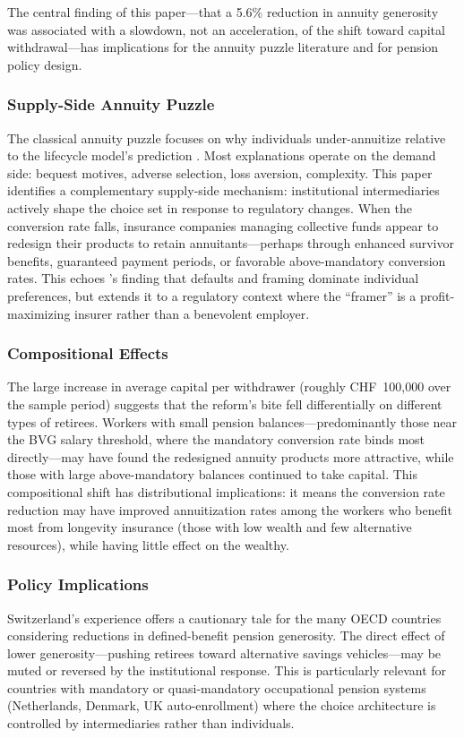 \documentclass[12pt]{article}
\begin{document}
The central finding of this paper---that a 5.6\% reduction in annuity generosity was associated with a slowdown, not an acceleration, of the shift toward capital withdrawal---has implications for the annuity puzzle literature and for pension policy design.

\subsubsection*{Supply-Side Annuity Puzzle} The classical annuity puzzle focuses on why individuals under-annuitize relative to the lifecycle model's prediction \citep{yaari1965uncertain}. Most explanations operate on the demand side: bequest motives, adverse selection, loss aversion, complexity. This paper identifies a complementary supply-side mechanism: institutional intermediaries actively shape the choice set in response to regulatory changes. When the conversion rate falls, insurance companies managing collective funds appear to redesign their products to retain annuitants---perhaps through enhanced survivor benefits, guaranteed payment periods, or favorable above-mandatory conversion rates. This echoes \citet{beshears2014annuitization}'s finding that defaults and framing dominate individual preferences, but extends it to a regulatory context where the ``framer'' is a profit-maximizing insurer rather than a benevolent employer.

\subsubsection*{Compositional Effects} The large increase in average capital per withdrawer (roughly CHF~100,000 over the sample period) suggests that the reform's bite fell differentially on different types of retirees. Workers with small pension balances---predominantly those near the BVG salary threshold, where the mandatory conversion rate binds most directly---may have found the redesigned annuity products more attractive, while those with large above-mandatory balances continued to take capital. This compositional shift has distributional implications: it means the conversion rate reduction may have improved annuitization rates among the workers who benefit most from longevity insurance (those with low wealth and few alternative resources), while having little effect on the wealthy.

\subsubsection*{Policy Implications} Switzerland's experience offers a cautionary tale for the many OECD countries considering reductions in defined-benefit pension generosity. The direct effect of lower generosity---pushing retirees toward alternative savings vehicles---may be muted or reversed by the institutional response. This is particularly relevant for countries with mandatory or quasi-mandatory occupational pension systems (Netherlands, Denmark, UK auto-enrollment) where the choice architecture is controlled by intermediaries rather than individuals.
\end{document}
